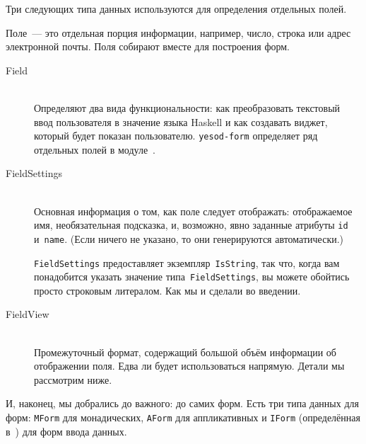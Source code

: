 Три следующих типа данных используются для определения отдельных полей.

\begin{remark}
Поле~--- это отдельная порция информации, например, число, строка или адрес
электронной почты. Поля собирают вместе для построения форм.
\end{remark}

\begin{description}
    \item[Field] \hfill \\
        Определяют два вида функциональности: как преобразовать текстовый ввод
        пользователя в значение языка Haskell и как создавать виджет, который
        будет показан пользователю.  \texttt{yesod-form} определяет ряд
        отдельных полей в
        модуле~.

    \item[FieldSettings] \hfill \\
        Основная информация о том, как поле следует отображать: отображаемое имя,
        необязательная подсказка, и, возможно, явно заданные атрибуты
        \lstinline'id' и~\lstinline'name'. (Если ничего не указано, то они
        генерируются автоматически.)

        \begin{remark}
            \lstinline'FieldSettings' предоставляет
            экземпляр~\lstinline'IsString', так что, когда вам понадобится
            указать значение типа~\lstinline'FieldSettings', вы можете
            обойтись просто строковым литералом. Как мы и сделали во введении.
        \end{remark}

    \item[FieldView] \hfill \\
        Промежуточный формат, содержащий большой объём информации об отображении поля.
        Едва ли будет использоваться напрямую. Детали мы рассмотрим ниже.
\end{description}

И, наконец, мы добрались до важного: до самих форм. Есть три типа данных для форм:
\lstinline'MForm' для монадических, \lstinline'AForm' для аппликативных и
\lstinline'IForm' (определённая
в~)
для форм ввода данных.

